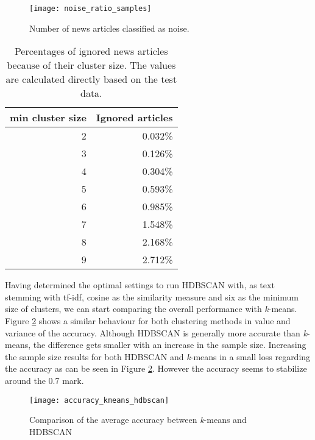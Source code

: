 \begin{figure}[h]
    \centering
    \texttt{[image: noise\_ratio\_samples]}
    \caption{Number of news articles classified as noise.}
    \label{fig:noise_ratio_samples}
\end{figure}

\begin{table}[h]
    \label{tab:expected_noise}
    \centering
    \begin{tabular}{|r|r|}
        \hline
        \textbf{min cluster size} & \textbf{Ignored articles} \\
        \hline
        2 & 0.032\% \\ \hline
        3 & 0.126\% \\ \hline
        4 & 0.304\% \\ \hline
        5 & 0.593\% \\ \hline
        6 & 0.985\% \\ \hline
        7 & 1.548\% \\ \hline
        8 & 2.168\% \\ \hline
        9 & 2.712\% \\ \hline
    \end{tabular}
    \caption{Percentages of ignored news articles because of their cluster size. The values are calculated directly based on the test data.}
\end{table}


Having determined the optimal settings to run HDBSCAN with, as text stemming with tf-idf, cosine as the similarity measure and six as the minimum size of clusters, we can start comparing the overall performance with \textit{k}-means. Figure \ref{fig:accuracy_kmeans_hdbscan} shows  a similar behaviour for both clustering methods in value and variance of the accuracy. Although HDBSCAN is generally more accurate than \textit{k}-means, the difference gets smaller with an increase in the sample size. Increasing the sample size results for both HDBSCAN and \textit{k}-means in a small loss regarding the accuracy as can be seen in Figure \ref{fig:accuracy_kmeans_hdbscan}. However the accuracy seems to stabilize around the 0.7 mark.

\begin{figure}[h]
    \centering
    \texttt{[image: accuracy\_kmeans\_hdbscan]}
    \caption{Comparison of the average accuracy between \textit{k}-means and HDBSCAN}
    \label{fig:accuracy_kmeans_hdbscan}
\end{figure}

